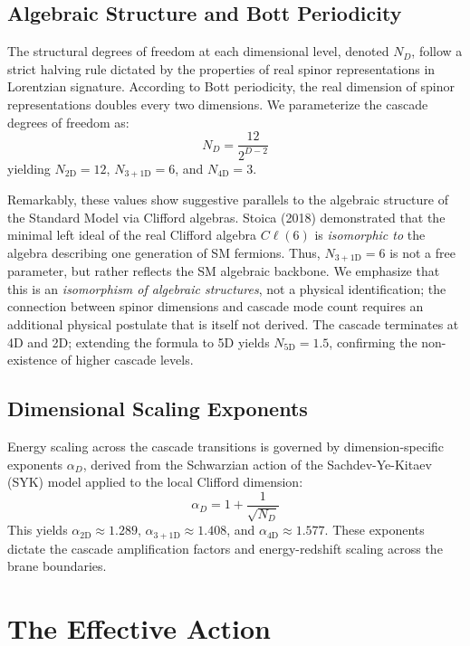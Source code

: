 \documentclass[12pt, a4paper]{article}
\begin{document}
\subsection{Algebraic Structure and Bott Periodicity}
The structural degrees of freedom at each dimensional level, denoted $N_D$, follow a strict halving rule dictated by the properties of real spinor representations in Lorentzian signature. According to Bott periodicity, the real dimension of spinor representations doubles every two dimensions. We parameterize the cascade degrees of freedom as:
\begin{equation}
    N_D = \frac{12}{2^{D-2}}
\end{equation}
yielding $N_{2\text{D}} = 12$, $N_{3+1\text{D}} = 6$, and $N_{4\text{D}} = 3$. 

Remarkably, these values show suggestive parallels to the algebraic structure of the Standard Model via Clifford algebras. Stoica (2018) demonstrated that the minimal left ideal of the real Clifford algebra $C\ell(6)$ is \textit{isomorphic to} the algebra describing one generation of SM fermions. Thus, $N_{3+1\text{D}} = 6$ is not a free parameter, but rather reflects the SM algebraic backbone. We emphasize that this is an \textit{isomorphism of algebraic structures}, not a physical identification; the connection between spinor dimensions and cascade mode count requires an additional physical postulate that is itself not derived. The cascade terminates at 4D and 2D; extending the formula to 5D yields $N_{5\text{D}} = 1.5$, confirming the non-existence of higher cascade levels.

\subsection{Dimensional Scaling Exponents}
Energy scaling across the cascade transitions is governed by dimension-specific exponents $\alpha_D$, derived from the Schwarzian action of the Sachdev-Ye-Kitaev (SYK) model applied to the local Clifford dimension:
\begin{equation}
    \alpha_D = 1 + \frac{1}{\sqrt{N_D}}
\end{equation}
This yields $\alpha_{2\text{D}} \approx 1.289$, $\alpha_{3+1\text{D}} \approx 1.408$, and $\alpha_{4\text{D}} \approx 1.577$. These exponents dictate the cascade amplification factors and energy-redshift scaling across the brane boundaries.

\section{The Effective Action}
\label{sec:lagrangian}
\end{document}
